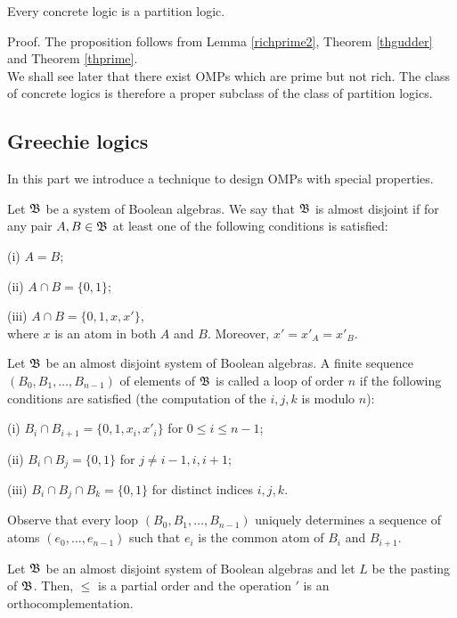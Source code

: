 \begin{corollary}
Every concrete logic is a partition logic.
\end{corollary}

Proof. The proposition follows from Lemma \ref{richprime2},
Theorem \ref{thgudder} and Theorem \ref{thprime}. \\

We shall see later that there exist OMPs which are prime but not rich.
The class of concrete logics is therefore a proper subclass
of the class of partition logics.

\subsection{Greechie logics}

In this part we introduce a technique to design OMPs with special
properties.

\begin{defin}
Let ${\frak B}$ be a system of Boolean algebras.
We say that ${\frak B}$ is almost disjoint if for any pair $A,B \in {\frak B}$
at least one of the following conditions is satisfied:

(i) $A = B$;

(ii) $A \cap B = \{0,1\}$;

(iii) $A \cap B = \{0,1,x,x'\}$, \\
where $x$ is an atom in both $A$ and $B$. Moreover, $x' = x'_A
=x'_B$.
\end{defin}

\begin{defin}
Let ${\frak B}$ be an almost disjoint system of Boolean algebras.
A finite sequence $(B_0,B_1,\ldots,B_{n-1})$ of elements of ${\frak B}$
is called a loop of order $n$ if the following conditions are
satisfied (the computation of the $i,j,k$ is modulo $n$):

(i) $B_i \cap B_{i+1} = \{0,1,x_i,x'_i\}$ for $0 \le i \le n-1$;

(ii) $B_i \cap B_j = \{0,1\}$ for $j \neq i-1,i,i+1$;

(iii) $B_i \cap B_j \cap B_k = \{0,1\}$ for distinct indices $i,j,k$.
\end{defin}

Observe that every loop $(B_0,B_1,\ldots,B_{n-1})$ uniquely
determines a sequence of atoms $(e_0, \ldots, e_{n-1})$
such that $e_i$ is the common atom of $B_i$ and $B_{i+1}$.

\begin{lemma}
Let ${\frak B}$ be an almost disjoint system of Boolean algebras and
let $L$ be the pasting of ${\frak B}$.
Then, $\le$ is a partial order and the operation $'$ is an
orthocomplementation.
\end{lemma}

